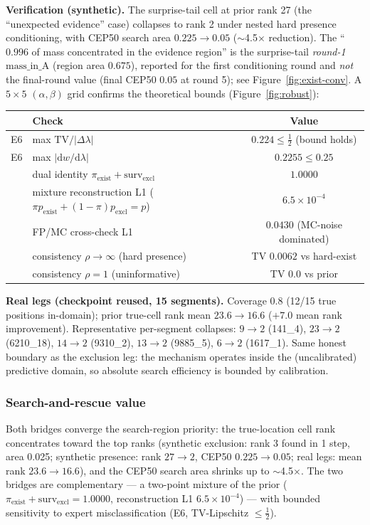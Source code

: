 \documentclass[11pt]{article}
\begin{document}
\textbf{Verification (synthetic).} The surprise-tail cell at prior rank 27
(the ``unexpected evidence'' case) collapses to rank 2 under nested hard
presence conditioning, with CEP50 search area $0.225\to0.05$ ($\sim$4.5$\times$
reduction).  The ``$0.996$ of mass concentrated in the evidence region'' is
the surprise-tail \emph{round-1} $\mathrm{mass\_in\_A}$ (region area $0.675$),
reported for the first conditioning round and \emph{not} the final-round
value (final CEP50 $0.05$ at round 5); see Figure~\ref{fig:exist-conv}.  A
$5\times5$ $(\alpha,\beta)$ grid confirms
the theoretical bounds (Figure~\ref{fig:robust}):
\begin{center}
\small
\begin{tabular}{llc}
\toprule
 & Check & Value \\
\midrule
E6 & max $\mathrm{TV}/|\Delta\lambda|$ & $0.224\le\tfrac12$ (bound holds) \\
E6 & max $|\mathrm{d}w/\mathrm{d}\lambda|$ & $0.2255\le0.25$ \\
 & dual identity $\pi_{\mathrm{exist}}+\mathrm{surv}_{\mathrm{excl}}$ & $1.0000$ \\
 & mixture reconstruction L1 ($\pi p_{\mathrm{exist}}+(1{-}\pi)p_{\mathrm{excl}}{=}p$) & $6.5\times10^{-4}$ \\
 & FP/MC cross-check L1 & $0.0430$ (MC-noise dominated) \\
 & consistency $\rho\to\infty$ (hard presence) & TV $0.0062$ vs hard-exist \\
 & consistency $\rho=1$ (uninformative) & TV $0.0$ vs prior \\
\bottomrule
\end{tabular}
\end{center}

\textbf{Real legs (checkpoint reused, 15 segments).} Coverage $0.8$ (12/15
true positions in-domain); prior true-cell rank mean $23.6\to16.6$ ($+7.0$
mean rank improvement).  Representative per-segment collapses:
$9\to2$ (141\_4), $23\to2$ (6210\_18), $14\to2$ (9310\_2), $13\to2$
(9885\_5), $6\to2$ (1617\_1).  Same honest boundary as the exclusion leg:
the mechanism operates inside the (uncalibrated) predictive domain, so
absolute search efficiency is bounded by calibration.

\subsubsection{Search-and-rescue value}
Both bridges converge the search-region priority: the true-location cell
rank concentrates toward the top ranks (synthetic exclusion: rank 3 found in
1 step, area 0.025; synthetic presence: rank $27\to2$, CEP50 $0.225\to0.05$;
real legs: mean rank $23.6\to16.6$), and the CEP50 search area shrinks up to
$\sim$4.5$\times$.  The two bridges are complementary --- a two-point
mixture of the prior ($\pi_{\mathrm{exist}}+\mathrm{surv}_{\mathrm{excl}}
=1.0000$, reconstruction L1 $6.5\times10^{-4}$) --- with bounded sensitivity
to expert misclassification (E6, TV-Lipschitz $\le\tfrac12$).
\end{document}
